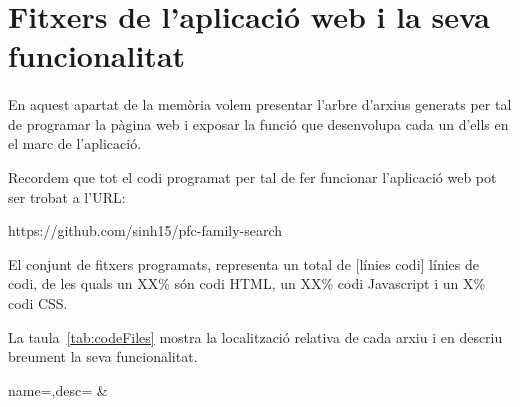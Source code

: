 \section{Fitxers de l'aplicació web i la seva funcionalitat}

    \paragraph{}
    En aquest apartat de la memòria volem presentar l'arbre d'arxius generats per tal de programar la pàgina web i exposar la funció que desenvolupa cada un d'ells en el marc de l'aplicació.

    Recordem que tot el codi programat per tal de fer funcionar l’aplicació web pot ser trobat a l'URL:

    \begin{displayquote}
        https://github.com/sinh15/pfc-family-search
    \end{displayquote}

    El conjunt de fitxers programats, representa un total de [línies codi] línies de codi, de les quals un XX\% són codi HTML, un XX\% codi Javascript i un X\% codi CSS.

    La taula~\ref{tab:codeFiles} mostra la localització relativa de cada arxiu i en descriu breument la seva funcionalitat.

    \begin{center}
             {name=\name,desc=\desc}
             {\name&\desc}
     \end{center}
